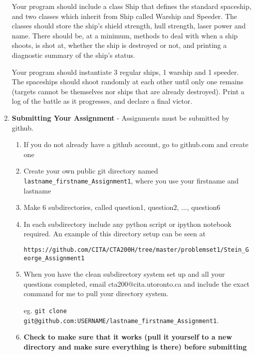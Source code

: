 \documentclass[]{article}
\begin{document}
\begin{enumerate}
Your program should include a class Ship that defines the standard spaceship, and two classes which inherit from Ship called Warship and Speeder. The classes should store the ship's shield strength, hull strength, laser power and name. There should be, at a minimum, methods to deal with when a ship shoots, is shot at, whether the ship is destroyed or not, and printing a diagnostic summary of the ship's status. 

Your program should instantiate 3 regular ships, 1 warship and 1 speeder. The spaceships should shoot randomly at each other until only one remains (targets cannot be themselves nor ships that are already destroyed). Print a log of the battle as it progresses, and declare a final victor.


\item \textbf{Submitting Your Assignment} - Assignments must be submitted by github.

\begin{enumerate}
\item If you do not already have a github account, go to github.com and create one
\item Create your own public git directory named \verb|lastname_firstname_Assignment1|, where you use your firstname and lastname
\item Make 6 subdirectories, called question1, question2, ..., question6
\item In each subdirectory include any python script or ipython notebook required. An example of this directory setup can be seen at
 
\hspace{-2cm}\verb|https://github.com/CITA/CTA200H/tree/master/problemset1/Stein_George_Assignment1|
\item When you have the clean subdirectory system set up and all your questions completed, email cta200@cita.utoronto.ca and include the exact command for me to pull your directory system. 

eg. \verb|git clone git@github.com:USERNAME/lastname_firstname_Assignment1|. 
\item \textbf{Check to make sure that it works (pull it yourself to a new directory and make sure everything is there) before submitting}

\end{enumerate}
\end{enumerate}
\end{document}
